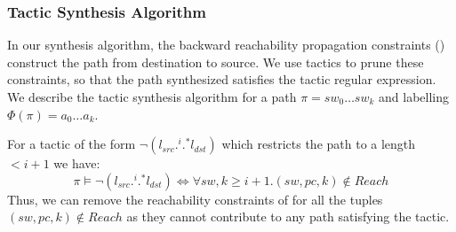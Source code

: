 \subsubsection{Tactic Synthesis Algorithm}
In our synthesis algorithm, the backward reachability propagation constraints () 
construct the path from destination to source. We use tactics to prune these constraints, so that
the path synthesized satisfies the tactic regular expression.  
We describe the tactic synthesis algorithm
for a path $\pi = sw_0 \ldots sw_k$ and labelling $\Phi(\pi) = a_0 \ldots a_k$. 

For a tactic of the form $\neg (l_{src} .^i .^* l_{dst})$ which restricts the path to a length $ < i + 1$ we have: 
\begin{equation}
	\pi \models \neg (l_{src} .^i .^* l_{dst}) \Leftrightarrow \forall sw,k \geq i + 1. (sw,pc,k) \notin Reach
\end{equation}
Thus, we can remove the reachability constraints  of  
for all the tuples $(sw,pc,k) \notin Reach$
as they cannot contribute to any path satisfying the tactic.  

